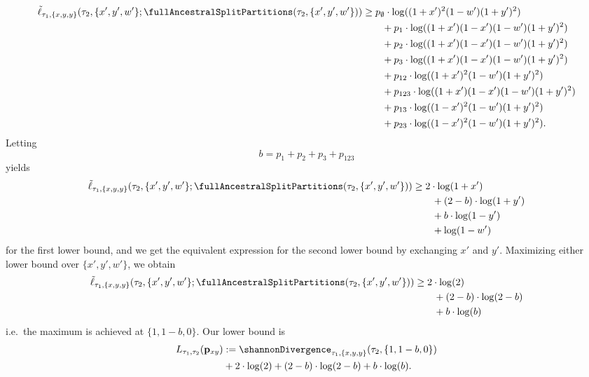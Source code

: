 \begin{align*}
    \tilde{\ell}_{\tau_1,\{x,y,y\}}(\tau_2, \{x',y',w'\}; \fullAncestralSplitPartitions(\tau_2,\{x',y',w'\}))
    &\ge      p_{\emptyset}  \cdot\log((1+x')^2    (1-w')(1+y')^2) \\
    &\qquad + p_{1}          \cdot\log((1+x')(1-x')(1-w')(1+y')^2) \\
    &\qquad + p_{2}          \cdot\log((1+x')(1-x')(1-w')(1+y')^2) \\
    &\qquad + p_{3}          \cdot\log((1+x')(1-x')(1-w')(1+y')^2) \\
    &\qquad + p_{12}         \cdot\log((1+x')^2    (1-w')(1+y')^2) \\
    &\qquad + p_{123}        \cdot\log((1+x')(1-x')(1-w')(1+y')^2)\\
    &\qquad + p_{13}         \cdot\log((1-x')^2    (1-w')(1+y')^2) \\
    &\qquad + p_{23}         \cdot\log((1-x')^2    (1-w')(1+y')^2).
\end{align*}
Letting
$$
b = p_{1}+p_{2}+p_{3}+p_{123}
$$
yields
\begin{align*}
    \tilde{\ell}_{\tau_1,\{x,y,y\}}(\tau_2, \{x',y',w'\}; \fullAncestralSplitPartitions(\tau_2,\{x',y',w'\}))
    &\ge      2\cdot\log(1+x') \\
    &\qquad + (2-b)  \cdot\log(1+y') \\
    &\qquad + b      \cdot\log(1-y') \\
    &\qquad + \log(1-w')
\end{align*}
for the first lower bound, and we get the equivalent expression for the second lower bound by exchanging $x'$ and $y'$.
Maximizing either lower bound over $\{x',y',w'\}$, we obtain
\begin{align*}
    \tilde{\ell}_{\tau_1,\{x,y,y\}}(\tau_2, \{x',y',w'\}; \fullAncestralSplitPartitions(\tau_2,\{x',y',w'\}))
    &\ge      2\cdot\log(2) \\
    &\qquad + (2-b)  \cdot\log(2-b) \\
    &\qquad + b      \cdot\log(b)
\end{align*}
%
i.e.\ the maximum is achieved at $\{1,1-b,0\}$.
Our lower bound is
\begin{align*}
    L_{\tau_1,\tau_2}(\mathbf{p}_{xy}) &:= \shannonDivergence_{\tau_1,\{x,y,y\}}(\tau_2,\{1,1-b,0\}) \\
                                           &+ 2\cdot\log(2) + (2-b)  \cdot\log(2-b) + b      \cdot\log(b).
\end{align*}

